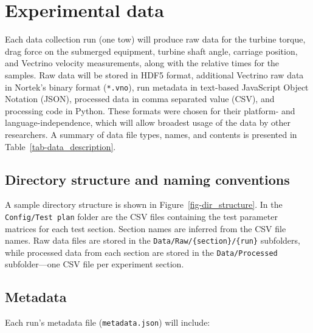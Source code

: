 \documentclass[12pt,letterpaper]{scrreprt}
\begin{document}
\section{Experimental data}\label{sec-exp_data}

Each data collection run (one tow) will produce raw data for the turbine torque,
drag force on the submerged equipment, turbine shaft angle, carriage position,
and Vectrino velocity measurements, along with the relative times for the
samples. Raw data will be stored in HDF5 format, additional Vectrino raw data in
Nortek's binary format (\texttt{*.vno}), run metadata in text-based JavaScript
Object Notation (JSON), processed data in comma separated value (CSV), and
processing code in Python. These formats were chosen for their platform- and
language-independence, which will allow broadest usage of the data by other
researchers. A summary of data file types, names, and contents is presented in
Table~\ref{tab-data_description}.

\subsection{Directory structure and naming conventions}

A sample directory structure is shown in Figure~\ref{fig-dir_structure}. In the
\texttt{Config/Test plan} folder are the CSV files containing the test parameter
matrices for each test section. Section names are inferred from the CSV file
names. Raw data files are stored in the \texttt{Data/Raw/\{section\}/\{run\}}
subfolders, while processed data from each section are stored in the
\texttt{Data/Processed} subfolder---one CSV file per experiment section.

\subsection{Metadata}

Each run's metadata file (\texttt{metadata.json}) will include:
\end{document}
